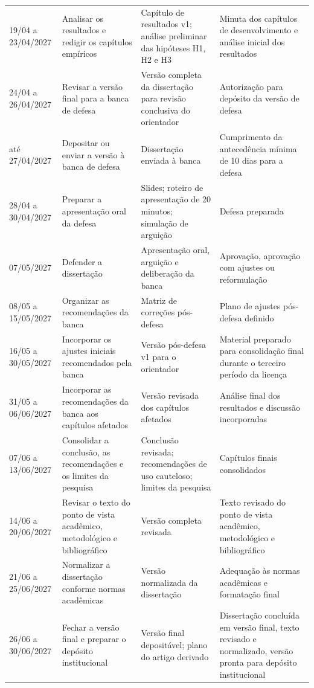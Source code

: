 \documentclass[11pt,a4paper]{article}
\begin{document}
\begin{longtable}{P{3.2cm}P{7.5cm}P{8.0cm}P{7.5cm}}
19/04 a 23/04/2027 & Analisar os resultados e redigir os capítulos empíricos & Capítulo de resultados v1; análise preliminar das hipóteses H1, H2 e H3 & Minuta dos capítulos de desenvolvimento e análise inicial dos resultados \\
24/04 a 26/04/2027 & Revisar a versão final para a banca de defesa & Versão completa da dissertação para revisão conclusiva do orientador & Autorização para depósito da versão de defesa \\
até 27/04/2027 & Depositar ou enviar a versão à banca de defesa & Dissertação enviada à banca & Cumprimento da antecedência mínima de 10 dias para a defesa \\
28/04 a 30/04/2027 & Preparar a apresentação oral da defesa & Slides; roteiro de apresentação de 20 minutos; simulação de arguição & Defesa preparada \\
07/05/2027 & Defender a dissertação & Apresentação oral, arguição e deliberação da banca & Aprovação, aprovação com ajustes ou reformulação \\
08/05 a 15/05/2027 & Organizar as recomendações da banca & Matriz de correções pós-defesa & Plano de ajustes pós-defesa definido \\
16/05 a 30/05/2027 & Incorporar os ajustes iniciais recomendados pela banca & Versão pós-defesa v1 para o orientador & Material preparado para consolidação final durante o terceiro período da licença \\
31/05 a 06/06/2027 & Incorporar as recomendações da banca aos capítulos afetados & Versão revisada dos capítulos afetados & Análise final dos resultados e discussão incorporadas \\
07/06 a 13/06/2027 & Consolidar a conclusão, as recomendações e os limites da pesquisa & Conclusão revisada; recomendações de uso cauteloso; limites da pesquisa & Capítulos finais consolidados \\
14/06 a 20/06/2027 & Revisar o texto do ponto de vista acadêmico, metodológico e bibliográfico & Versão completa revisada & Texto revisado do ponto de vista acadêmico, metodológico e bibliográfico \\
21/06 a 25/06/2027 & Normalizar a dissertação conforme normas acadêmicas & Versão normalizada da dissertação & Adequação às normas acadêmicas e formatação final \\
26/06 a 30/06/2027 & Fechar a versão final e preparar o depósito institucional & Versão final depositável; plano do artigo derivado & Dissertação concluída em versão final, texto revisado e normalizado, versão pronta para depósito institucional \\
\end{longtable}
\end{document}
